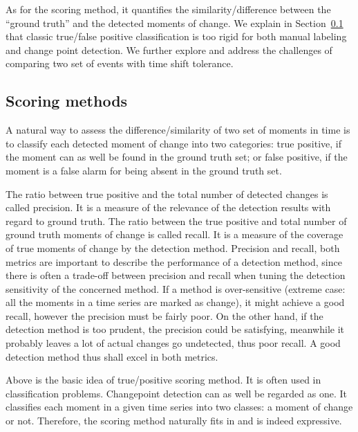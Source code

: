 As for the scoring method, it quantifies the similarity/difference between the ``ground truth'' and the detected moments of change.
We explain in Section~\ref{sec:score} that classic true/false positive classification is too rigid for both manual labeling and change point detection.
We further explore and address the challenges of comparing two set of events with time shift tolerance.

\subsection{Scoring methods}
\label{sec:score}

A natural way to assess the difference/similarity of two set of moments in time is to classify each detected moment of change into two categories: true positive, if the moment can as well be found in the ground truth set; or false positive, if the moment is a false alarm for being absent in the ground truth set.

The ratio between true positive and the total number of detected changes is called precision.
It is a measure of the relevance of the detection results with regard to ground truth.
The ratio between the true positive and total number of ground truth moments of change is called recall.
It is a measure of the coverage of true moments of change by the detection method.
Precision and recall, both metrics are important to describe the performance of a detection method, since there is often a trade-off between precision and recall when tuning the detection sensitivity of the concerned method.
If a method is over-sensitive (extreme case: all the moments in a time series are marked as change), it might achieve a good recall,  however the precision must be fairly poor.
On the other hand, if the detection method is too prudent, the precision could be satisfying, meanwhile it probably leaves a lot of actual changes go undetected, thus poor recall.
A good detection method thus shall excel in both metrics.

Above is the basic idea of true/positive scoring method.
It is often used in classification problems.
Changepoint detection can as well be regarded as one.
It classifies each moment in a given time series into two classes: a moment of change or not.
Therefore, the scoring method naturally fits in and is indeed expressive.

